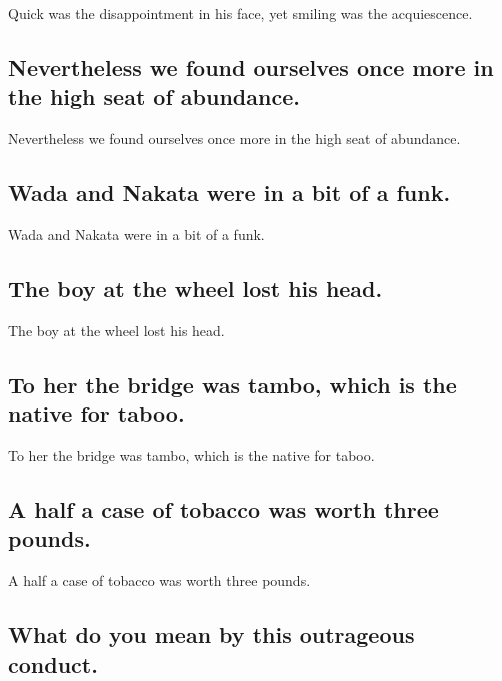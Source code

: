 \documentclass[]{article}
\begin{document}
Quick was the disappointment in his face, yet smiling was the
acquiescence.

\hypertarget{nevertheless-we-found-ourselves-once-more-in-the-high-seat-of-abundance.}{%
\subsection{Nevertheless we found ourselves once more in the high seat
of
abundance.}\label{nevertheless-we-found-ourselves-once-more-in-the-high-seat-of-abundance.}}

Nevertheless we found ourselves once more in the high seat of abundance.

\hypertarget{wada-and-nakata-were-in-a-bit-of-a-funk.}{%
\subsection{Wada and Nakata were in a bit of a
funk.}\label{wada-and-nakata-were-in-a-bit-of-a-funk.}}

Wada and Nakata were in a bit of a funk.

\hypertarget{the-boy-at-the-wheel-lost-his-head.}{%
\subsection{The boy at the wheel lost his
head.}\label{the-boy-at-the-wheel-lost-his-head.}}

The boy at the wheel lost his head.

\hypertarget{to-her-the-bridge-was-tambo-which-is-the-native-for-taboo.}{%
\subsection{To her the bridge was tambo, which is the native for
taboo.}\label{to-her-the-bridge-was-tambo-which-is-the-native-for-taboo.}}

To her the bridge was tambo, which is the native for taboo.

\hypertarget{a-half-a-case-of-tobacco-was-worth-three-pounds.}{%
\subsection{A half a case of tobacco was worth three
pounds.}\label{a-half-a-case-of-tobacco-was-worth-three-pounds.}}

A half a case of tobacco was worth three pounds.

\hypertarget{what-do-you-mean-by-this-outrageous-conduct.}{%
\subsection{What do you mean by this outrageous
conduct.}\label{what-do-you-mean-by-this-outrageous-conduct.}}
\end{document}
